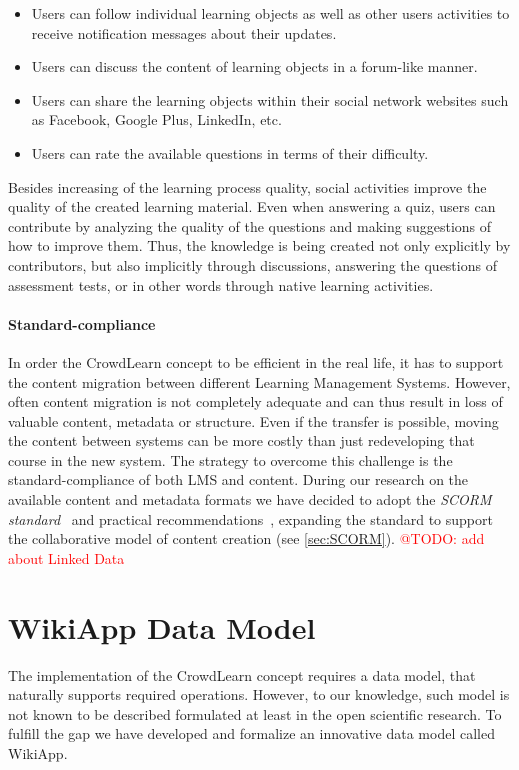 \documentclass[ngerman,UKenglish,table]{scrbook}
\makeatletter
\newcommand{\todo}[1]{\textcolor{red}{@TODO: #1}}
\makeatother
\begin{document}
\begin{itemize}
\item Users can follow individual learning objects as well as other users activities to receive notification messages about their updates. 
\item Users can discuss the content of learning objects in a forum-like manner. 
\item Users can share the learning objects within their social network websites such as Facebook, Google Plus, LinkedIn, etc. 
\item Users can rate the available questions in terms of their difficulty.
\end{itemize}

Besides increasing of the learning process quality, social activities improve the quality of the created learning material.
Even when answering a quiz, users can contribute by analyzing the quality of the questions and making suggestions of how to improve them.
Thus, the knowledge is being created not only explicitly by contributors, but also implicitly through discussions, answering the questions of assessment tests, or in other words through native learning activities.

\paragraph{Standard-compliance}
In order the CrowdLearn concept to be efficient in the real life, it has to support the content migration between different Learning Management Systems.
However, often content migration is not completely adequate and can thus result in loss of valuable content, metadata or structure.
Even if the transfer is possible, moving the content between systems can be more costly than just redeveloping that course in the new system.
The strategy to overcome this challenge is the standard-compliance of both LMS and content.
During our research on the available content and metadata formats we have decided to adopt the \emph{SCORM standard}~\cite{scorm_specification2011} and practical recommendations~\cite{scorm2011}, expanding the standard to support the collaborative model of content creation (see \autoref{sec:SCORM}).
\todo{add about Linked Data}


\section{WikiApp Data Model}
\label{sec:wikiapp}
The implementation of the CrowdLearn concept requires a data model, that naturally supports required operations. 
However, to our knowledge, such model is not known to be described formulated at least in the open scientific research.
To fulfill the gap we have developed and formalize an innovative data model called WikiApp.
\end{document}
